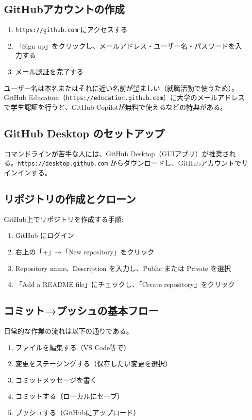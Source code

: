 \subsection{GitHubアカウントの作成}

\begin{enumerate}
\item \texttt{https://github.com} にアクセスする
\item 「Sign up」をクリックし、メールアドレス・ユーザー名・パスワードを入力する
\item メール認証を完了する
\end{enumerate}

ユーザー名は本名またはそれに近い名前が望ましい（就職活動で使うため）。GitHub Education（\texttt{https://education.github.com}）に大学のメールアドレスで学生認証を行うと、GitHub Copilotが無料で使えるなどの特典がある。

\subsection{GitHub Desktop のセットアップ}

コマンドラインが苦手な人には、GitHub Desktop（GUIアプリ）が推奨される。\texttt{https://desktop.github.com} からダウンロードし、GitHubアカウントでサインインする。

\subsection{リポジトリの作成とクローン}

GitHub上でリポジトリを作成する手順:
\begin{enumerate}
\item GitHub にログイン
\item 右上の「+」→「New repository」をクリック
\item Repository name、Description を入力し、Public または Private を選択
\item 「Add a README file」にチェックし、「Create repository」をクリック
\end{enumerate}

\subsection{コミット→プッシュの基本フロー}

日常的な作業の流れは以下の通りである。

\begin{enumerate}
\item ファイルを編集する（VS Code等で）
\item 変更をステージングする（保存したい変更を選択）
\item コミットメッセージを書く
\item コミットする（ローカルにセーブ）
\item プッシュする（GitHubにアップロード）
\end{enumerate}

